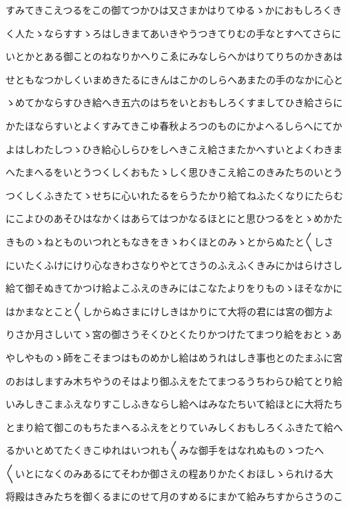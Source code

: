 \documentclass[a4paper,11pt,landscape]{ltjtarticle}
\begin{document}
すみてきこえつるをこの御てつかひは又さまかはりてゆるゝかにおもしろくき
\par\medskip
く人たゝならすすゝろはしきまてあいきやうつきてりむの手なとすへてさらに
\par\medskip
いとかとある御ことのねなりかへりこゑにみなしらへかはりてりちのかきあは
\par\medskip
せともなつかしくいまめきたるにきんはこかのしらへあまたの手のなかに心と
\par\medskip
ゝめてかならすひき給へき五六のはちをいとおもしろくすましてひき給さらに
\par\medskip
かたほならすいとよくすみてきこゆ春秋よろつのものにかよへるしらへにてか
\par\medskip
よはしわたしつゝひき給心しらひをしへきこえ給さまたかへすいとよくわきま
\par\medskip
へたまへるをいとうつくしくおもたゝしく思ひきこえ給このきみたちのいとう
\par\medskip
つくしくふきたてゝせちに心いれたるをらうたかり給てねふたくなりにたらむ
\par\medskip
にこよひのあそひはなかくはあらてはつかなるほとにと思ひつるをとゝめかた
\par\medskip
きものゝねとものいつれともなきをきゝわくほとのみゝとからぬたと〱しさ
\par\medskip
にいたくふけにけり心なきわさなりやとてさうのふえふくきみにかはらけさし
\par\medskip
給て御そぬきてかつけ給よこふえのきみにはこなたよりをりものゝほそなかに
\par\medskip
はかまなとこと〱しからぬさまにけしきはかりにて大将の君には宮の御方よ
\par\medskip
りさか月さしいてゝ宮の御さうそくひとくたりかつけたてまつり給をおとゝあ
\par\medskip
やしやものゝ師をこそまつはものめかし給はめうれはしき事也とのたまふに宮
\par\medskip
のおはしますみ木ちやうのそはより御ふえをたてまつるうちわらひ給てとり給
\par\medskip
いみしきこまふえなりすこしふきならし給へはみなたちいて給ほとに大将たち
\par\medskip
とまり給て御このもちたまへるふえをとりていみしくおもしろくふきたて給へ
\par\medskip
るかいとめてたくきこゆれはいつれも〱みな御手をはなれぬものゝつたへ
\par\medskip
〱いとになくのみあるにてそわか御さえの程ありかたくおほしゝられける大
\par\medskip
将殿はきみたちを御くるまにのせて月のすめるにまかて給みちすからさうのこ
\end{document}
